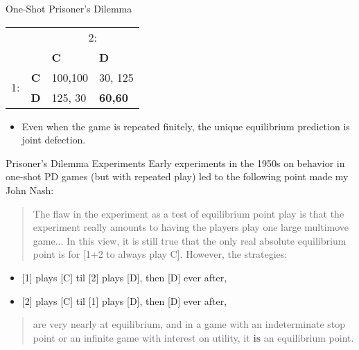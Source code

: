\documentclass{beamer}
\begin{document}
\begin{frame}{One-Shot Prisoner's Dilemma}
\begin{center}
\begin{tabular}{cc|p{}|p{}|}
 & \multicolumn{1}{c}{} & \multicolumn{2}{c}{2:}\\
 & \multicolumn{1}{c}{} & \multicolumn{1}{p{0.14\textwidth}}{\textbf{C}} & \multicolumn{1}{p{0.14\textwidth}}{\textbf{D}}\\
\cline{3-4}
\multirow{2}{*}{1:} & \textbf{C} & 100,100 & 30, 125\\
\cline{3-4}
 & \textbf{D} & 125, 30 & \textbf{60,60}\\
\cline{3-4}
\end{tabular}
\end{center}
\begin{itemize}
\item Even when the game is repeated finitely, the unique equilibrium prediction
is joint defection.
\end{itemize}
\end{frame}

\begin{frame}{Prisoner's Dilemma Experiments}
Early experiments in the 1950s on behavior in one-shot PD games (but
with repeated play) led to the following point made my John Nash:
\begin{quotation}
The flaw in the experiment as a test of equilibrium point play is
that the experiment really amounts to having the players play one
large multimove game... In this view, it is still true that the only
real absolute equilibrium point is for {[}1+2 to always play C{]}.
However, the strategies:\end{quotation}
\begin{itemize}
\item {[}1{]} plays {[}C{]} til {[}2{]} plays {[}D{]}, then {[}D{]} ever
after,
\item {[}2{]} plays {[}C{]} til {[}1{]} plays {[}D{]}, then {[}D{]} ever
after,\end{itemize}
	\begin{quotation}
	are very nearly at equilibrium, and in a game with an indeterminate
	stop point or an infinite game with interest on utility, it \textbf{is}
	an equilibrium point.
	\end{quotation}
\end{frame}
\end{document}

